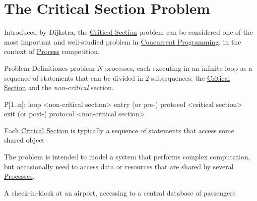 \section{The Critical Section Problem}\label{sec:cp_the_critical_section_problem} %
Introduced by Dijkstra, the \hyperref[sub:an_critical_sections]{Critical Section} problem can be considered one of the most important and well-studied problem in \hyperref[def:conc-prog]{Concurrent Programming}, in the context of \hyperref[def:process]{Process} competition.
\begin{theorem}{Problem Definition}{cs-problem}
    $N$ processes, each executing in an infinite loop as a sequence of statements that can be divided in $2$ subsequences: the \hyperref[sub:an_critical_sections]{Critical Section} and the \textit{non-critical} section.
    \begin{codeblock}{}
    P[1..n]:
    loop {
        <non-critical section>
        entry (or pre-) protocol
        <critical section>
        exit (or post-) protocol
        <non-critical section>
    }
    \end{codeblock}
    \begin{note}
        Each \hyperref[sub:an_critical_sections]{Critical Section} is typically a sequence of statements that access some shared object
    \end{note}
\end{theorem}
The problem is intended to model a system that performs complex computation, but occasionally need to access data or resources that are shared by several \hyperref[def:process]{Processes}.
\begin{example}{}{}
    A check-in-kiosk at an airport, accessing to a central database of passengers
\end{example}
%
